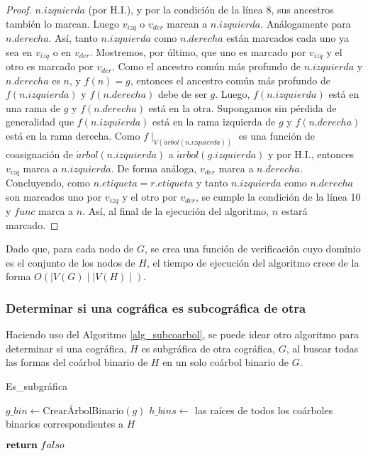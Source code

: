 \begin{proof}
    $n.izquierda$ (por H.I.), y por la condición de la línea 8, sus ancestros
    también lo marcan. Luego $v_{izq}$ o $v_{der}$ marcan a $n.izquierda$.
    Análogamente para $n.derecha$. Así, tanto $n.izquierda$ como $n.derecha$
    están marcados cada uno ya sea en $v_{izq}$ o en $v_{der}$. Mostremos, por
    último, que uno es marcado por $v_{izq}$ y el otro es marcado por $v_{der}$.
    Como el ancestro común más profundo de $n.izquierda$ y $n.derecha$ es $n$, y
    $f(n)=g$, entonces el ancestro común más profundo de $f(n.izquierda)$ y
    $f(n.derecha)$ debe de ser $g$. Luego, $f(n.izquierda)$ está en una rama de
    $g$ y $f(n.derecha)$ está en la otra. Supongamos sin pérdida de generalidad
    que $f(n.izquierda)$ está en la rama izquierda de $g$ y $f(n.derecha)$ está
    en la rama derecha. Como $f\mid_{V(\acute{a}rbol(n.izquierda))}$ es una
    función de coasignación de $\acute{a}rbol(n.izquierda)$ a
    $\acute{a}rbol(g.izquierda)$ y por H.I., entonces $v_{izq}$ marca a
    $n.izquierda$. De forma análoga, $v_{der}$ marca a $n.derecha$. Concluyendo,
    como $n.etiqueta = r.etiqueta$ y tanto $n.izquierda$ como $n.derecha$ son
    marcados uno por $v_{izq}$ y el otro por $v_{der}$, se cumple la condición
    de la línea 10 y $func$ marca a $n$. Así, al final de la ejecución del
    algoritmo, $n$ estará marcado.

\end{proof}

Dado que, para cada nodo de $G$, se crea una función de verificación cuyo
dominio es el conjunto de los nodos de $H$, el tiempo de ejecución del algoritmo
crece de la forma $O(\mid V(G) \mid \mid V(H) \mid)$. 

\subsubsection{Determinar si una cográfica es subcográfica de otra}

Haciendo uso del Algoritmo \ref{alg_subcoarbol}, se puede idear otro algoritmo
para determinar si una cográfica, $H$ es subgráfica de otra cográfica, $G$, al
buscar todas las formas del coárbol binario de $H$ en un solo coárbol binario de
$G$.

\begin{algorithm}[ht!]
\caption{Es\_subgráfica}
\label{alg_subgraph}
\DontPrintSemicolon %

$g\_bin \gets \text{CrearÁrbolBinario}(g)$\;
$h\_bins \gets$ las raíces de todos los coárboles binarios correspondientes a $H$\;


$\Return\ falso$\;

\end{algorithm}

